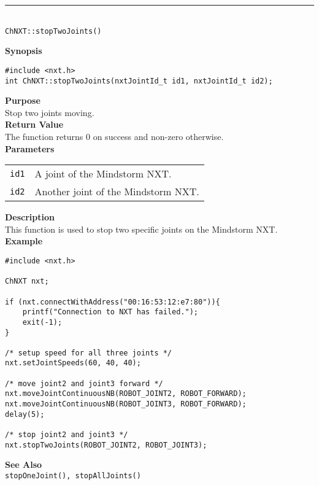 \noindent
\vspace{5pt}
\rule{4.5in}{0.015in}\\
\noindent
{\LARGE \texttt{ChNXT::stopTwoJoints()} }\\


\noindent
{\bf Synopsis}
\vspace{-8pt}
\begin{verbatim}
#include <nxt.h>
int ChNXT::stopTwoJoints(nxtJointId_t id1, nxtJointId_t id2);
\end{verbatim}

\noindent
{\bf Purpose}\\
Stop two joints moving.\\

\noindent
{\bf Return Value}\\
The function returns 0 on success and non-zero otherwise.\\

\noindent
{\bf Parameters}\\
\vspace{-0.1in}
\begin{description}
\item
\begin{tabular}{ p{20mm}p{135mm} }
\texttt{id1}       &A joint of the Mindstorm NXT.\\
\texttt{id2}      &Another joint of the Mindstorm NXT.\\
\end{tabular}
\end{description}

\noindent
{\bf Description}\\
This function is used to stop two specific joints on the Mindstorm NXT.\\

\noindent
{\bf Example}
\begin{verbatim}
#include <nxt.h> 

ChNXT nxt;

if (nxt.connectWithAddress("00:16:53:12:e7:80")){
    printf("Connection to NXT has failed.");
    exit(-1);
}
    
/* setup speed for all three joints */
nxt.setJointSpeeds(60, 40, 40);

/* move joint2 and joint3 forward */
nxt.moveJointContinuousNB(ROBOT_JOINT2, ROBOT_FORWARD);
nxt.moveJointContinuousNB(ROBOT_JOINT3, ROBOT_FORWARD);
delay(5);

/* stop joint2 and joint3 */
nxt.stopTwoJoints(ROBOT_JOINT2, ROBOT_JOINT3);
\end{verbatim}

\noindent
{\bf See Also}\\
\texttt{stopOneJoint(), stopAllJoints()}\\
